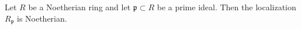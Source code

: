 Let $R$ be a Noetherian ring and let $\mathfrak{p} \subset R$ be a prime ideal. Then the localization $R_{\mathfrak{p}}$ is Noetherian.
